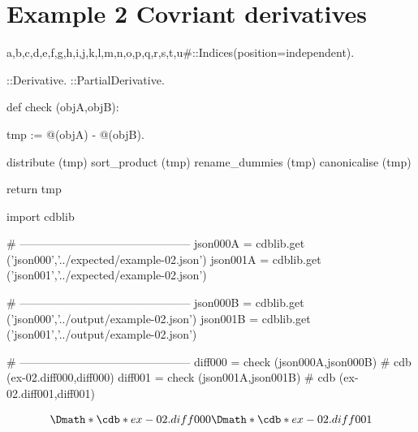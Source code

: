 \documentclass[12pt]{cdblatex}
\begin{document}
\section*{Example 2 Covriant derivatives}

\begin{cadabra}
   {a,b,c,d,e,f,g,h,i,j,k,l,m,n,o,p,q,r,s,t,u#}::Indices(position=independent).

   \nabla{#}::Derivative.
   \partial{#}::PartialDerivative.

   def check (objA,objB):

       tmp := @(objA) - @(objB).

       distribute     (tmp)
       sort_product   (tmp)
       rename_dummies (tmp)
       canonicalise   (tmp)

       return tmp

   import cdblib

   # ---------------------------------------------
   json000A = cdblib.get ('json000','../expected/example-02.json')
   json001A = cdblib.get ('json001','../expected/example-02.json')

   # ---------------------------------------------
   json000B = cdblib.get ('json000','../output/example-02.json')
   json001B = cdblib.get ('json001','../output/example-02.json')

   # ---------------------------------------------
   diff000 = check (json000A,json000B)   # cdb (ex-02.diff000,diff000)
   diff001 = check (json001A,json001B)   # cdb (ex-02.diff001,diff001)

\end{cadabra}

\clearpage

\begin{dgroup*}
   \Dmath*{\cdb*{ex-02.diff000}}
   \Dmath*{\cdb*{ex-02.diff001}}
\end{dgroup*}
\end{document}
